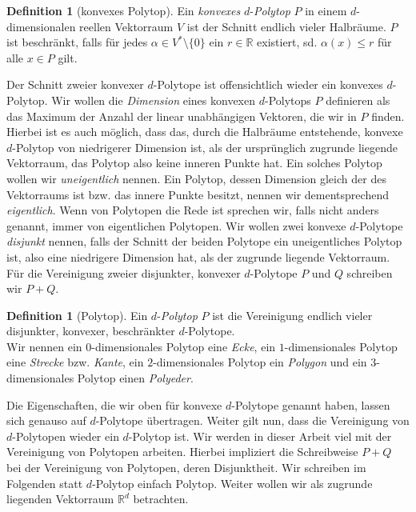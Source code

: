 \documentclass[11pt,titlepage]{article}
\newcommand{\setR}{\mathbb{R}}
\theoremstyle{definition}
\newtheorem{definition}[theorem]{Definition}
\theoremstyle{remark}
\begin{document}
	\begin{definition}[konvexes Polytop]
		Ein \textsl{konvexes} $d$-\textsl{Polytop} $P$ in einem $d$-dimensionalen reellen Vektorraum $V$ ist der Schnitt endlich vieler 
		Halbräume. $P$ ist beschränkt, falls für jedes $\alpha\in V^*\setminus\{0\}$ ein $r\in \setR$ existiert, sd. 
		$\alpha(x)\leq r$ für alle $x\in P$ gilt.
	\end{definition}
	
	Der Schnitt zweier konvexer $d$-Polytope ist offensichtlich wieder ein konvexes $d$-Polytop. 
	Wir wollen die \textsl{Dimension} eines konvexen $d$-Polytops $P$ 
	definieren als das 
	Maximum der Anzahl der linear unabhängigen Vektoren, die wir in $P$ finden. 
	Hierbei ist es auch möglich, dass das, durch die Halbräume entstehende, 
	konvexe $d$-Polytop von niedrigerer Dimension ist, als der ursprünglich 
	zugrunde liegende Vektorraum, das Polytop also keine inneren Punkte hat. 
	Ein solches Polytop wollen wir \textsl{uneigentlich} nennen. 
	Ein Polytop, dessen 
	Dimension gleich der des Vektorraums ist bzw. das innere Punkte besitzt, 
	nennen wir dementsprechend \textsl{eigentlich}. 
	Wenn von Polytopen die Rede ist 
	sprechen wir, falls nicht anders genannt, immer von eigentlichen Polytopen.
	Wir wollen zwei konvexe $d$-Polytope \textsl{disjunkt} nennen, 
	falls der Schnitt der 
	beiden Polytope ein uneigentliches Polytop ist, also eine niedrigere 
	Dimension hat, als der zugrunde liegende Vektorraum. Für die Vereinigung 
	zweier disjunkter, konvexer $d$-Polytope $P$ und $Q$ schreiben wir $P+Q$.
	
	\begin{definition}[Polytop]
		Ein $d$-\textsl{Polytop} $P$ ist die Vereinigung endlich vieler 
		disjunkter, konvexer, beschränkter $d$-Polytope. \\
		Wir nennen ein $0$-dimensionales Polytop eine \textsl{Ecke}, ein 
		$1$-dimensionales Polytop eine \textsl{Strecke} bzw. \textsl{Kante}, ein 
		$2$-dimensionales Polytop ein \textsl{Polygon} und ein 
		$3$-dimensionales Polytop einen \textsl{Polyeder}.
	\end{definition}
	
	Die Eigenschaften, die wir oben für konvexe $d$-Polytope genannt haben, 
	lassen sich genauso auf $d$-Polytope übertragen. Weiter gilt nun, dass 
	die Vereinigung von $d$-Polytopen wieder ein $d$-Polytop ist. 
	Wir werden in dieser Arbeit viel mit der Vereinigung von Polytopen arbeiten. 
	Hierbei impliziert die Schreibweise $P+Q$ bei der Vereinigung von Polytopen, 
	deren Disjunktheit. Wir schreiben im Folgenden statt $d$-Polytop einfach Polytop. Weiter wollen wir als zugrunde liegenden Vektorraum $\setR^d$ 
	betrachten.
	
\end{document}
